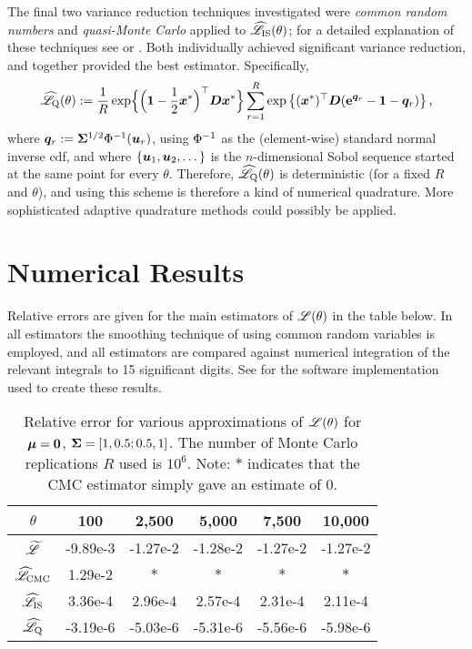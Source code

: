 The final two variance reduction techniques investigated were \emph{common
  random numbers} and \emph{quasi-Monte Carlo} applied to
$\widehat{\mathscr{L}}_{\mathrm{IS}}(\theta)$; for a detailed explanation of
these techniques see \cite{glasserman2003monte} or
\cite{asmussen2007stochastic}. Both individually achieved significant variance
reduction, and together provided the best estimator. Specifically,
%
\[ \widehat{\mathscr{L}}_{\mathrm{Q}}(\theta) := \frac{1}{R} \exp\Bigl\{ \Bigl(\bm{1} - \frac12 \bm{x}^* \Bigr)^\top \bm{D} \bm{x}^* \Bigr\}  \sum_{r=1}^R \exp\left\{ (\bm{x}^*)^\top \bm{D} (\text{\bf{e}}^{\bm{q}_r} - \bm{1} - \bm{q}_r) \right\}, \]
%
where $\bm{q}_r := \bm{\Sigma}^{1/2} \mathrm{\bm{\Phi}}^{-1}(\bm{u}_r)$, using
$\mathrm{\bm{\Phi}}^{-1}$ as the (element-wise) standard normal inverse
cdf, and where $\{\bm{u}_1, \bm{u}_2, \dots\}$ is the $n$-dimensional Sobol
sequence started at the same point for every $\theta$. Therefore,
$\widehat{\mathscr{L}}_{\mathrm{Q}}(\theta)$ is deterministic (for a fixed $R$
and $\theta$), and using this scheme is therefore a kind of numerical
quadrature. More sophisticated adaptive quadrature methods could possibly be
applied.

\section{Numerical Results}\label{S:Num}

Relative errors are given for the main estimators of $\mathscr{L}(\theta)$ in the
table below. In all estimators the smoothing technique of using common random
variables is employed, and all estimators are compared against numerical
integration of the relevant integrals to 15 significant digits. See \cite{CodeLaplaceSLN} for the software implementation used to create these results.

\begin{table}[ht]
\centering
\caption{Relative error for various approximations of $\mathscr{L}(\theta)$ for
  $\bm{\mu} = \bm{0}$, $\bm{\Sigma} = [1, 0.5; 0.5, 1]$. The number of Monte Carlo
  replications $R$ used is $10^6$. Note: $*$ indicates that the CMC estimator
  simply gave an estimate of 0.}
\vspace{3pt}
\begin{tabular}{cccccc}
\hline
{$\theta$}& 100 & 2{,}500 & 5{,}000 & 7{,}500 & 10{,}000 \\ \hline
$\widetilde{\Laplace}$\raisebox{1pt}{\vphantom{$\widetilde{\Laplace}$}}&
{-9.89e-3 }&{-1.27e-2 }&{-1.28e-2 }&{-1.27e-2 }&{-1.27e-2 }\\
{$\widehat{\mathscr{L}}_{\mathrm{CMC}}$}&
{1.29e-2 }&{$*$}&{$*$}&{$*$}&{$*$} \\
{$\widehat{\mathscr{L}}_{\mathrm{IS}}$}&
{3.36e-4 }&{2.96e-4 }&{2.57e-4 }&{2.31e-4 }&{2.11e-4 } \\
{$\widehat{\mathscr{L}}_{\mathrm{Q}}$}&
{-3.19e-6 }&{-5.03e-6 }&{-5.31e-6}&{-5.56e-6 }&{-5.98e-6 } \\ \hline
\end{tabular}
\end{table}

